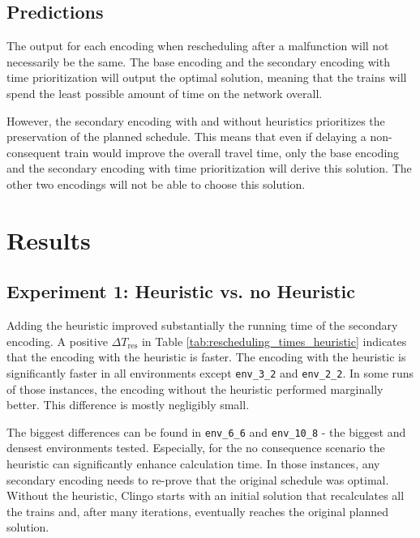 \documentclass[runningheads]{llncs}
\begin{document}
\subsection{Predictions}
The output for each encoding when rescheduling after a malfunction will not
necessarily be the same. The base encoding and the secondary encoding with
time prioritization will output the optimal solution, meaning that the trains
will spend the least possible amount of time on the network overall.

However, the secondary encoding with and without heuristics prioritizes the
preservation of the planned schedule. This means that even if delaying a
non-consequent train would improve the overall travel time, only the base
encoding and the secondary encoding with time prioritization will derive this
solution. The other two encodings will not be able to choose this solution.

\section[Results]{Results\footnotemark}


\subsection{Experiment 1: Heuristic vs. no Heuristic}

Adding the heuristic improved substantially the running time of the secondary encoding. 
A positive $\Delta T_{\mathrm{res}}$ in Table \ref{tab:rescheduling_times_heuristic} indicates that the encoding with the heuristic is faster. The encoding with the heuristic is significantly faster in all environments except \texttt{env\_3\_2} and \texttt{env\_2\_2}. In some runs of those instances, the encoding without the heuristic performed marginally better. This difference is mostly negligibly small.

The biggest differences can be found in \texttt{env\_6\_6} and \texttt{env\_10\_8} - the biggest and densest environments tested. Especially, for the no consequence scenario the heuristic can significantly enhance calculation time. In those instances, any secondary encoding needs to
re-prove that the original schedule was optimal. Without the heuristic, Clingo starts with an initial solution that recalculates all the trains and, after many iterations, eventually reaches the original planned solution.
\end{document}

